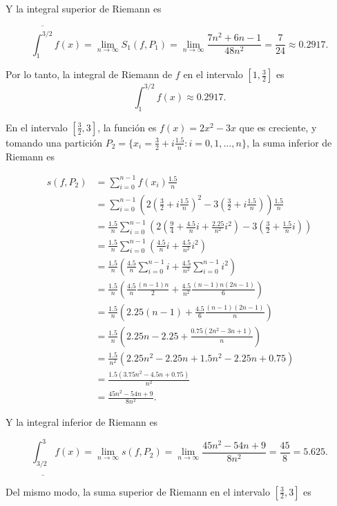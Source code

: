 \documentclass[
  spanish,
  a4paper,
]{scrreport}
\theoremstyle{definition}
\theoremstyle{remark}
\begin{document}
\begin{tcolorbox}
Y la integral superior de Riemann es

\[
\overline{\int_1^{3/2}} f(x)  = \lim_{n \to \infty} S_1(f,P_1) = \lim_{n \to \infty} \frac{7n^2+6n-1}{48n^2} = \frac{7}{24} \approx 0.2917.
\]

Por lo tanto, la integral de Riemann de \(f\) en el intervalo
\([1, \frac{3}{2}]\) es \[
\int_1^{3/2} f(x) \approx 0.2917.
\]

En el intervalo \([\frac{3}{2}, 3]\), la función es \(f(x) = 2x^2 - 3x\)
que es creciente, y tomando una partición
\(P_2=\{x_i=\frac{3}{2}+i\frac{1.5}{n} : i=0,1,\ldots,n\}\), la suma
inferior de Riemann es

\begin{align*}
s(f,P_2) &= \sum_{i=0}^{n-1} f(x_i)\frac{1.5}{n}\\
&= \sum_{i=0}^{n-1} \left(2\left(\frac{3}{2}+i\frac{1.5}{n}\right)^2 - 3\left(\frac{3}{2}+i\frac{1.5}{n}\right)\right)\frac{1.5}{n}\\
&= \frac{1.5}{n} \sum_{i=0}^{n-1} \left(2\left(\frac{9}{4}+\frac{4.5}{n}i+\frac{2.25}{n^2}i^2\right)-3\left(\frac{3}{2}+\frac{1.5}{n}i\right)\right)\\
&= \frac{1.5}{n} \sum_{i=0}^{n-1} \left(\frac{4.5}{n}i+\frac{4.5}{n^2}i^2\right)\\
&= \frac{1.5}{n} \left(\frac{4.5}{n}\sum_{i=0}^{n-1} i + \frac{4.5}{n^2}\sum_{i=0}^{n-1} i^2\right)\\
&= \frac{1.5}{n} \left(\frac{4.5}{n}\frac{(n-1)n}{2} + \frac{4.5}{n^2}\frac{(n-1)n(2n-1)}{6}\right)\\
&= \frac{1.5}{n} \left(2.25(n-1) + \frac{4.5}{6}\frac{(n-1)(2n-1)}{n}\right)\\
&= \frac{1.5}{n} \left(2.25n-2.25 + \frac{0.75(2n^2-3n+1)}{n}\right)\\
&= \frac{1.5}{n^2} \left(2.25n^2-2.25n + 1.5n^2-2.25n+0.75\right)\\
&= \frac{1.5(3.75n^2 - 4.5n + 0.75)}{n^2}\\
&= \frac{45n^2-54n+9}{8n^2}.
\end{align*}

Y la integral inferior de Riemann es

\[
\underline{\int_{3/2}^3} f(x)  = \lim_{n \to \infty} s(f,P_2) = \lim_{n \to \infty} \frac{45n^2-54n+9}{8n^2} = \frac{45}{8} = 5.625.
\]

Del mismo modo, la suma superior de Riemann en el intervalo
\([\frac{3}{2}, 3]\) es


\end{tcolorbox}
\end{document}
